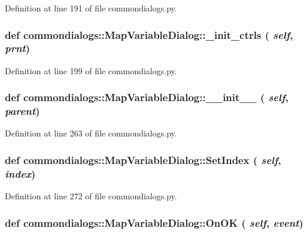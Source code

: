 Definition at line 191 of file commondialogs.py.\hypertarget{classcommondialogs_1_1MapVariableDialog_8ac9451c0ae750a90ecaeedbf04bab64}{
\subsubsection[\_\-init\_\-ctrls]{\setlength{\rightskip}{0pt plus 5cm}def commondialogs::Map\-Variable\-Dialog::\_\-init\_\-ctrls ( {\em self},  {\em prnt})}}
\label{classcommondialogs_1_1MapVariableDialog_8ac9451c0ae750a90ecaeedbf04bab64}




Definition at line 199 of file commondialogs.py.\hypertarget{classcommondialogs_1_1MapVariableDialog_1d6b6313208c4cfaf2243bbdf59d92d9}{
\subsubsection[\_\-\_\-init\_\-\_\-]{\setlength{\rightskip}{0pt plus 5cm}def commondialogs::Map\-Variable\-Dialog::\_\-\_\-init\_\-\_\- ( {\em self},  {\em parent})}}
\label{classcommondialogs_1_1MapVariableDialog_1d6b6313208c4cfaf2243bbdf59d92d9}




Definition at line 263 of file commondialogs.py.\hypertarget{classcommondialogs_1_1MapVariableDialog_bdab86c958f3e219882e7852b301dc4b}{
\subsubsection[SetIndex]{\setlength{\rightskip}{0pt plus 5cm}def commondialogs::Map\-Variable\-Dialog::Set\-Index ( {\em self},  {\em index})}}
\label{classcommondialogs_1_1MapVariableDialog_bdab86c958f3e219882e7852b301dc4b}




Definition at line 272 of file commondialogs.py.\hypertarget{classcommondialogs_1_1MapVariableDialog_31ebc1dd65eeec19147b3a5202d1e6a4}{
\subsubsection[OnOK]{\setlength{\rightskip}{0pt plus 5cm}def commondialogs::Map\-Variable\-Dialog::On\-OK ( {\em self},  {\em event})}}
\label{classcommondialogs_1_1MapVariableDialog_31ebc1dd65eeec19147b3a5202d1e6a4}




